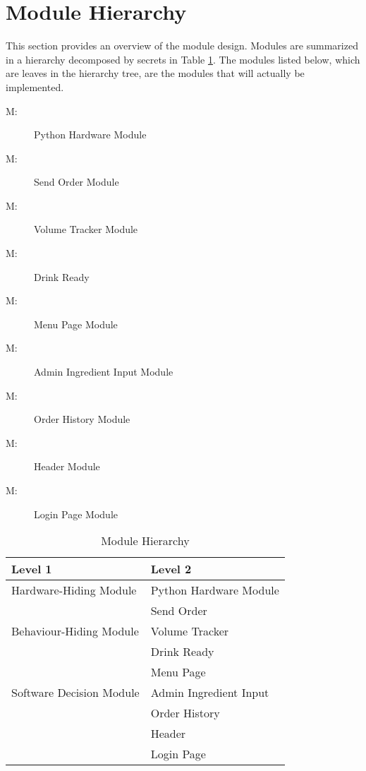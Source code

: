 \documentclass[12pt, titlepage]{article}
\newcounter{mnum}
\newcommand{\mthemnum}{M\themnum}
\begin{document}
\begin{description}
\end{description}

\section{Module Hierarchy} \label{SecMH}

This section provides an overview of the module design. Modules are summarized
in a hierarchy decomposed by secrets in Table \ref{TblMH}. The modules listed
below, which are leaves in the hierarchy tree, are the modules that will
actually be implemented.

\begin{description}
\item [ \mthemnum \label{mHH}:] Python Hardware Module
\item [ \mthemnum \label{mHH}:] 
Send Order Module
\item [ \mthemnum \label{mHH}:] 
Volume Tracker Module
\item [ \mthemnum \label{mHH}:] 
Drink Ready
\item [ \mthemnum \label{mHH}:] Menu Page Module
\item [ \mthemnum \label{mHH}:] Admin Ingredient Input Module
\item [ \mthemnum \label{mHH}:] Order History Module
\item [ \mthemnum \label{mHH}:] Header Module
\item [ \mthemnum \label{mHH}:] Login Page Module
\end{description}


\begin{table}[h!]
\centering
\begin{tabular}{p{} p{}}
\toprule
\textbf{Level 1} & \textbf{Level 2}\\
\midrule

{Hardware-Hiding Module} & Python Hardware Module \\
\midrule

\multirow{3}{0.3\textwidth}{Behaviour-Hiding Module}
& Send Order\\
& Volume Tracker\\
& Drink Ready\\
\midrule

\multirow{3}{0.3\textwidth}{Software Decision Module}
& Menu Page\\
& Admin Ingredient Input\\
& Order History\\
& Header\\
& Login Page\\
\bottomrule

\end{tabular}
\caption{Module Hierarchy}
\label{TblMH}
\end{table}
\end{document}
